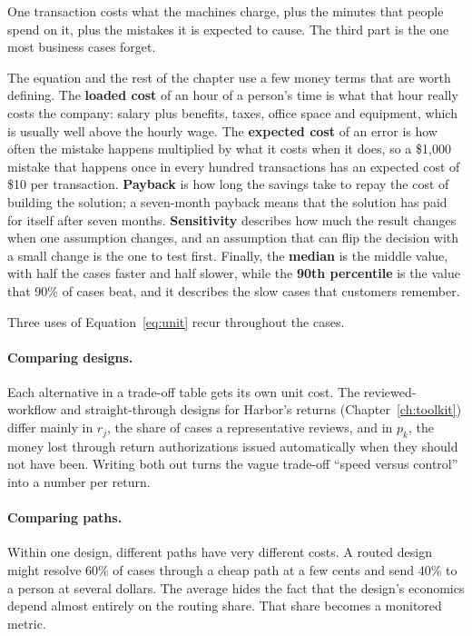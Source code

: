 \begin{keyidea}
One transaction costs what the machines charge, plus the minutes that people spend on it, plus the mistakes it is expected to cause. The third part is the one most business cases forget.
\end{keyidea}

The equation and the rest of the chapter use a few money terms that are worth defining. The \textbf{loaded cost} of an hour of a person's time is what that hour really costs the company: salary plus benefits, taxes, office space and equipment, which is usually well above the hourly wage. The \textbf{expected cost} of an error is how often the mistake happens multiplied by what it costs when it does, so a \$1{,}000 mistake that happens once in every hundred transactions has an expected cost of \$10 per transaction. \textbf{Payback} is how long the savings take to repay the cost of building the solution; a seven-month payback means that the solution has paid for itself after seven months. \textbf{Sensitivity} describes how much the result changes when one assumption changes, and an assumption that can flip the decision with a small change is the one to test first. Finally, the \textbf{median} is the middle value, with half the cases faster and half slower, while the \textbf{90th percentile} is the value that 90\% of cases beat, and it describes the slow cases that customers remember.


Three uses of Equation~\eqref{eq:unit} recur throughout the cases.

\paragraph{Comparing designs.} Each alternative in a trade-off table gets its own unit cost. The reviewed-workflow and straight-through designs for Harbor's returns (Chapter~\ref{ch:toolkit}) differ mainly in $r_j$, the share of cases a representative reviews, and in $p_k$, the money lost through return authorizations issued automatically when they should not have been. Writing both out turns the vague trade-off ``speed versus control'' into a number per return.

\paragraph{Comparing paths.} Within one design, different paths have very different costs. A routed design might resolve 60\% of cases through a cheap path at a few cents and send 40\% to a person at several dollars. The average hides the fact that the design's economics depend almost entirely on the routing share. That share becomes a monitored metric.

